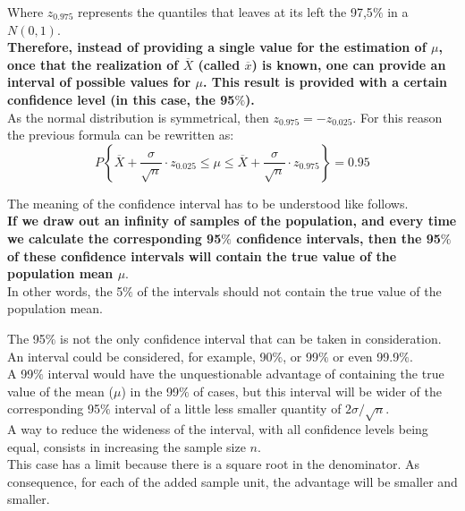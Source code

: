 \begin{frame}
  \vspace*{.5cm}
  Where $ z_{0.975} $ represents the quantiles that leaves at its left the 97,5$ \% $ in a $ N(0 ,1) $.\\
  \vspace*{.5cm}
  \textbf{Therefore, instead of providing a single value for the estimation of {\boldmath $ \mu $}, once that the realization of {\boldmath $ \overline{X} $} (called {\boldmath $ \overline{x} $}) is known, one can provide an interval of possible values for $ \mu $. This result is provided with a certain confidence level (in this case, the 95$ \% $).} \\
  \vspace*{.5cm}
  As the normal distribution is symmetrical, then $ z_{0.975} = - z_{0.025}$. For this reason the previous formula can be rewritten as:
  $$ P \left\{ \overline{X} + \frac{\sigma}{\sqrt{n}} \cdot z_{0.025} \leq \mu \leq \overline{X} + \frac{\sigma}{\sqrt{n}} \cdot z_{0.975} \right\} = 0.95 $$
\end{frame}

\begin{frame}
  \vspace*{.5cm}
  The meaning of the confidence interval has to be understood like follows.\\
  \vspace*{.15cm}
  \textbf{If we draw out an infinity of samples of the population, and every time we calculate the corresponding 95$ \% $ confidence intervals, then the 95$ \% $ of these confidence intervals will contain the true value of the population mean {\boldmath $ \mu $}}. \\
  \vspace*{.75cm}
  In other words, the 5$ \% $ of the intervals should not contain the true value of the population mean. \\    
\end{frame}

\begin{frame}
    \vspace*{.25cm}
    The 95$ \% $ is not the only confidence interval that can be taken in consideration. An interval could be considered, for example, 90$ \% $, or 99$ \% $ or even 99.9$ \% $. \\
    \vspace*{.25cm}
    A 99$ \% $ interval would have the unquestionable advantage of containing the true value of the mean ($\mu$) in the 99$\%$ of cases, but this interval will be wider of the corresponding 95$ \% $ interval of a little less smaller quantity of $ 2 \sigma / \sqrt{n} $. \\
    \vspace*{.25cm}
    A way to reduce the wideness of the interval, with all confidence levels being equal, consists in increasing the sample size $ n $. \\
    \vspace*{.25cm}
    This case has a limit because there is a square root in the denominator. As consequence, for each of the added sample unit, the advantage will be smaller and smaller.
\end{frame}

